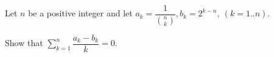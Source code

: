 Let $n$ be a positive integer and let $a_k = \dfrac{1}{\binom{n}{k}}, b_k = 2^{k-n},\ (k=1..n)$.

Show that $\sum_{k=1}^n \dfrac{a_k-b_k}{k} = 0$.